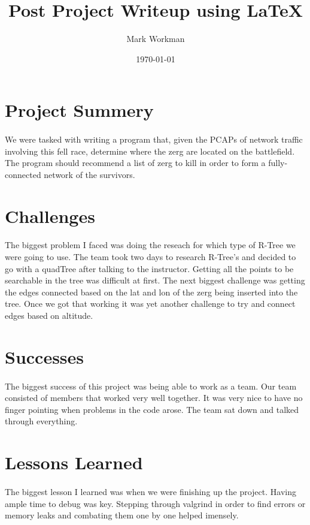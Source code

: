 \documentclass{article}
\author{Mark Workman}
\title{Post Project Writeup using \LaTeX}
\date{\today{}}
\begin{document}
\maketitle{}
\section{Project Summery}
\paragraph{}
We were tasked with writing a program that, given the PCAPs of network traffic involving this fell race, 
determine where the zerg are located on the battlefield.
The program should recommend a list of zerg to kill in order to form a fully-connected 
network of the survivors.
\section{Challenges}
\paragraph{}
The biggest problem I faced was doing the reseach for which type of R-Tree we were going to use.
The team took two days to research R-Tree's and decided to go with a quadTree after talking to the 
instructor. Getting all the points to be searchable in the tree was difficult at first. The next 
biggest challenge was getting the edges connected based on the lat and lon of the zerg being 
inserted into the tree. Once we got that working it was yet another challenge to try and connect edges 
based on altitude.
\section{Successes}
\paragraph{}
The biggest success of this project was being able to work as a team. Our team consisted of members that worked
very well together. It was very nice to have no finger pointing when problems in the code arose. The team sat down
and talked through everything.
\section{Lessons Learned}
\paragraph{}
The biggest lesson I learned was when we were finishing up the project. Having ample time to debug was key.
Stepping through valgrind in order to find errors or memory leaks and combating them one by one helped imensely.
\end{document}
